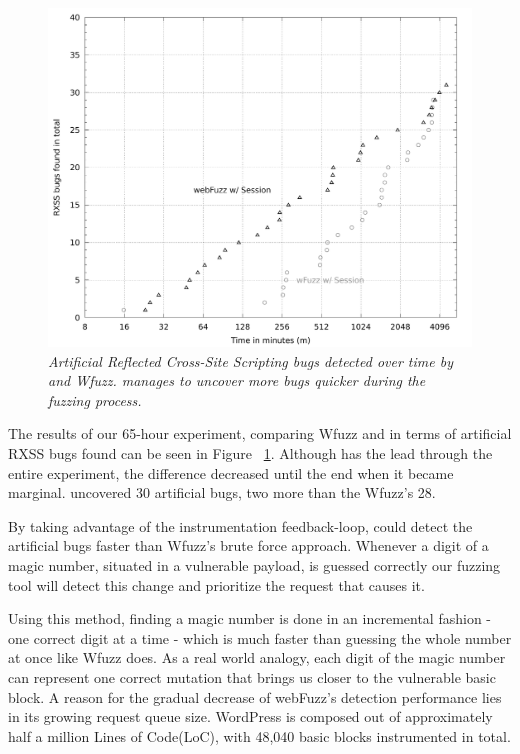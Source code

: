 \begin{figure}[!htb]
  \centering \includegraphics[width=\linewidth]{figures/plot_bugs.pdf}
  \captionsetup{justification=centering}
  \caption[Number of artificial XSS bugs uncovered by \pname{} and Wfuzz]{\textit{Artificial Reflected Cross-Site Scripting bugs detected over time by \pname{} and Wfuzz. \pname{} manages to uncover more bugs quicker during the fuzzing process.}} 
  \label{fig:plot_rxss}
\end{figure}

The results of our 65-hour experiment, comparing Wfuzz and \pname{} in terms of artificial RXSS bugs found can be seen in Figure ~\ref{fig:plot_rxss}. Although \pname{} has the lead through the entire experiment, the difference decreased until the end when it became marginal. \pname{} uncovered 30 artificial bugs, two more than the Wfuzz's 28.

By taking advantage of the instrumentation feedback-loop, \pname{} could detect the artificial bugs faster than Wfuzz's brute force approach. Whenever a digit of a magic
number, situated in a vulnerable payload, is guessed correctly our fuzzing tool will detect this change and prioritize the request that causes it. 

Using this method, finding a magic number is done in an incremental fashion - one correct digit at a time - which is much faster than guessing the whole number at once like Wfuzz does. As a real world analogy, each digit of the magic number can represent one correct mutation that brings us closer to the vulnerable basic block. A reason for the gradual decrease of webFuzz's detection performance lies in its growing request queue size. WordPress is composed out of approximately half a million Lines of Code(LoC), with 48,040 basic blocks instrumented in total.

